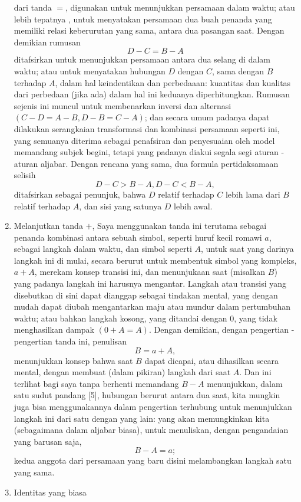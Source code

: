 \documentclass[a4paper, 12pt]{book}
\begin{document}
\begin{enumerate}
dari tanda $=$, digunakan untuk menunjukkan persamaan dalam waktu; atau
lebih tepatnya , untuk menyatakan persamaan dua buah penanda yang memiliki
relasi keberurutan yang sama, antara dua pasangan saat. Dengan demikian
rumusan
\[
D - C = B - A
\]
ditafsirkan untuk menunjukkan persamaan antara dua selang di dalam waktu;
atau untuk menyatakan hubungan $D$ dengan $C$, sama dengan $B$ terhadap $A$,
dalam hal keindentikan dan perbedaaan: kuantitas dan kualitas dari perbedaan
(jika ada) dalam hal ini keduanya diperhitungkan. Rumusan sejenis ini muncul
untuk membenarkan inversi dan alternasi $(C - D = A - B, D - B = C - A)$; dan
secara umum padanya dapat dilakukan serangkaian transformasi dan kombinasi
persamaan seperti ini, yang semuanya diterima sebagai penafsiran dan 
penyesuaian oleh model memandang subjek begini, tetapi yang padanya diakui
segala segi aturan - aturan aljabar. Dengan rencana yang sama, dua formula
pertidaksamaan selisih
\[
D - C > B - A, D - C < B - A,
\]
ditafsirkan sebagai penunjuk, bahwa $D$ relatif terhadap $C$ lebih lama dari
$B$ relatif terhadap $A$, dan sisi yang satunya $D$ lebih awal.
\item Melanjutkan tanda $+$, Saya menggunakan tanda ini terutama sebagai 
penanda kombinasi antara sebuah simbol, seperti huruf kecil romawi $a$, sebagai
langkah dalam waktu, dan simbol seperti $A$, untuk saat yang darinya langkah
ini di mulai, secara berurut untuk membentuk simbol yang kompleks, $a + A$,
merekam konsep transisi ini, dan menunjukaan saat (misalkan $B$) yang padanya
langkah ini harusnya mengantar. Langkah atau transisi yang disebutkan
di sini dapat dianggap sebagai tindakan mental, yang dengan mudah dapat
diubah mengantarkan maju atau mundur dalam pertumbuhan waktu; atau bahkan 
langkah kosong, yang ditandai dengan $0$, yang tidak menghasilkan dampak
$(0 + A = A)$. Dengan demikian, dengan pengertian - pengertian tanda ini, 
penulisan
\[
B = a + A,
\]
menunjukkan konsep bahwa saat $B$ dapat dicapai, atau dihasilkan secara mental,
dengan membuat (dalam pikiran) langkah dari saat $A$. Dan ini terlihat bagi 
saya tanpa berhenti memandang $B - A$ menunjukkan, dalam satu sudut pandang 
[5], hubungan berurut antara dua saat, kita mungkin juga bisa menggunakannya
dalam pengertian terhubung untuk menunjukkan langkah ini dari satu dengan 
yang lain: yang akan memungkinkan kita (sebagaimana dalam aljabar biasa), untuk
menuliskan, dengan pengandaian yang barusan saja,
\[
B - A = a;
\]
kedua anggota dari persamaan yang baru disini melambangkan langkah satu yang 
sama.
\item Identitas yang biasa

\end{enumerate}
\end{document}
